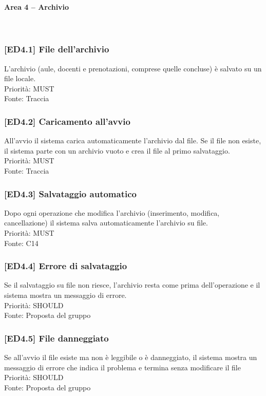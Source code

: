 \paragraph{Area 4 – Archivio}~\\
\subsubsection{[ED4.1] File dell'archivio}
L'archivio (aule, docenti e prenotazioni, comprese quelle concluse) è salvato su un file locale.\\
Priorità: MUST\\Fonte: Traccia

\subsubsection{[ED4.2] Caricamento all'avvio}
All'avvio il sistema carica automaticamente l'archivio dal file. Se il file non esiste, il sistema parte con un archivio vuoto e crea il file al primo salvataggio.\\
Priorità: MUST\\Fonte: Traccia

\subsubsection{[ED4.3] Salvataggio automatico}
Dopo ogni operazione che modifica l'archivio (inserimento, modifica, cancellazione) il sistema salva automaticamente l'archivio su file.\\
Priorità: MUST\\Fonte: C14

\subsubsection{[ED4.4] Errore di salvataggio}
Se il salvataggio su file non riesce, l'archivio resta come prima dell'operazione e il sistema mostra un messaggio di errore.\\
Priorità: SHOULD\\Fonte: Proposta del gruppo

\subsubsection{[ED4.5] File danneggiato}
Se all'avvio il file esiste ma non è leggibile o è danneggiato, il sistema mostra un messaggio di errore che indica il problema e termina senza modificare il file\\
Priorità: SHOULD\\Fonte: Proposta del gruppo
